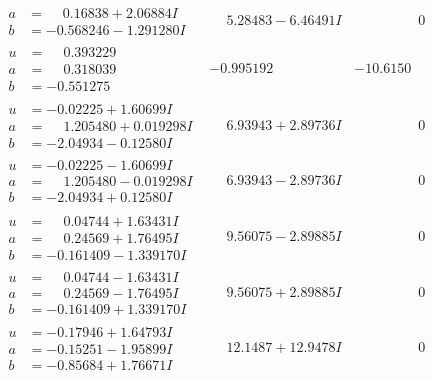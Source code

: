 \documentclass[1p]{elsarticle_modified}
\theoremstyle{definition}
\begin{document}
$$\begin{array}{c|c|c}
\begin{aligned}
a &= \phantom{-}0.16838 + 2.06884 I \\
b &= -0.568246 - 1.291280 I\end{aligned}
 & \phantom{-}5.28483 - 6.46491 I & \phantom{-0.000000 } 0 \\ \hline\begin{aligned}
u &= \phantom{-}0.393229\phantom{ +0.000000I} \\
a &= \phantom{-}0.318039\phantom{ +0.000000I} \\
b &= -0.551275\phantom{ +0.000000I}\end{aligned}
 & -0.995192\phantom{ +0.000000I} & -10.6150\phantom{ +0.000000I} \\ \hline\begin{aligned}
u &= -0.02225 + 1.60699 I \\
a &= \phantom{-}1.205480 + 0.019298 I \\
b &= -2.04934 - 0.12580 I\end{aligned}
 & \phantom{-}6.93943 + 2.89736 I & \phantom{-0.000000 } 0 \\ \hline\begin{aligned}
u &= -0.02225 - 1.60699 I \\
a &= \phantom{-}1.205480 - 0.019298 I \\
b &= -2.04934 + 0.12580 I\end{aligned}
 & \phantom{-}6.93943 - 2.89736 I & \phantom{-0.000000 } 0 \\ \hline\begin{aligned}
u &= \phantom{-}0.04744 + 1.63431 I \\
a &= \phantom{-}0.24569 + 1.76495 I \\
b &= -0.161409 - 1.339170 I\end{aligned}
 & \phantom{-}9.56075 - 2.89885 I & \phantom{-0.000000 } 0 \\ \hline\begin{aligned}
u &= \phantom{-}0.04744 - 1.63431 I \\
a &= \phantom{-}0.24569 - 1.76495 I \\
b &= -0.161409 + 1.339170 I\end{aligned}
 & \phantom{-}9.56075 + 2.89885 I & \phantom{-0.000000 } 0 \\ \hline\begin{aligned}
u &= -0.17946 + 1.64793 I \\
a &= -0.15251 - 1.95899 I \\
b &= -0.85684 + 1.76671 I\end{aligned}
 & \phantom{-}12.1487 + 12.9478 I & \phantom{-0.000000 } 0 \\ \hline\begin{aligned}

\end{aligned}
\end{array}$$
\end{document}
